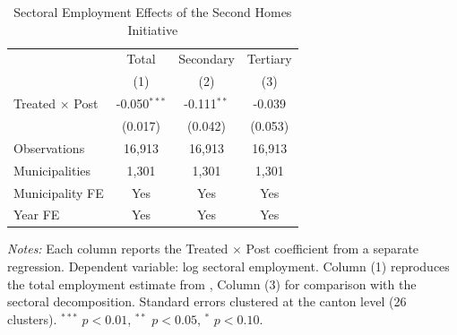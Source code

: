 \begin{table}[htbp]
\centering
\caption{Sectoral Employment Effects of the Second Homes Initiative}
\label{tab:mechanism_sectors}
\small
\begin{tabular}{lccc}
\toprule
  & Total & Secondary & Tertiary \\
 & (1) & (2) & (3) \\
\midrule
Treated $\times$ Post & -0.050$^{***}$ & -0.111$^{**}$ & -0.039 \\
  & (0.017) & (0.042) & (0.053) \\[6pt]
Observations & 16,913 & 16,913 & 16,913 \\
Municipalities & 1,301 & 1,301 & 1,301 \\
Municipality FE & Yes & Yes & Yes \\
Year FE & Yes & Yes & Yes \\
\bottomrule
\end{tabular}
\par\vspace{0.3em}
\begin{minipage}{\linewidth}
\footnotesize \textit{Notes:} Each column reports the Treated $\times$ Post coefficient from a separate regression. Dependent variable: log sectoral employment. Column (1) reproduces the total employment estimate from , Column (3) for comparison with the sectoral decomposition. Standard errors clustered at the canton level (26 clusters). $^{***}$ $p<0.01$, $^{**}$ $p<0.05$, $^{*}$ $p<0.10$.
\end{minipage}
\end{table}
